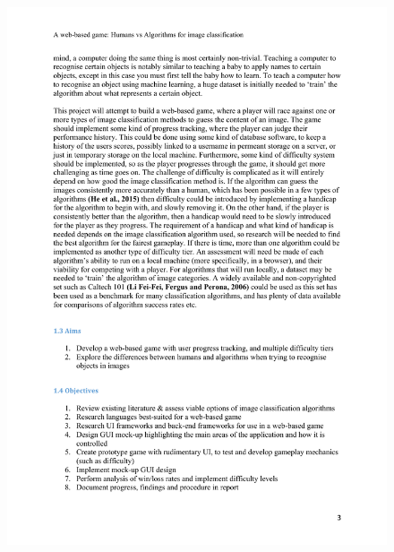 \documentclass[a4paper,12pt]{report}
\begin{document}
\begin{appendices}
    \begin{figure}[h]
      \centering
      \includegraphics[scale=0.8]{tor-3}
    \end{figure}


\end{appendices}
\end{document}

